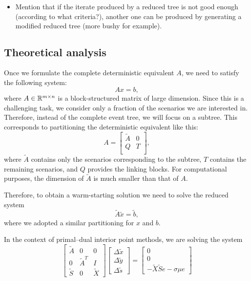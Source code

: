 {\begin{itemize}
\item Mention that if the iterate produced by a reduced tree 
is not good enough (according to what criteria?), another one 
can be produced by generating a modified reduced tree (more 
bushy for example).
\end{itemize}


\subsection{Theoretical analysis}

Once we formulate the complete deterministic equivalent $A$, we need 
to satisfy the following system:
\[
Ax=b,
\]
where $A\in \mathbb{R}^{m\times n}$ is a block-structured matrix of 
large dimension. Since this is a challenging task, we consider 
only a fraction of the scenarios we are interested in. Therefore, 
instead of the complete event tree, we will focus on a subtree. 
This corresponds to partitioning the deterministic equivalent 
like this:
\[
A = \left[ \begin{array}{cc}
    \tilde{A} & 0 \\ Q & T \\
    \end{array} \right],
\]
where $\tilde{A}$ contains only the scenarios corresponding 
to the subtree, $T$ contains the remaining scenarios, and $Q$ 
provides the linking blocks. For computational purposes, the 
dimension of $\tilde{A}$ is much smaller than that of $A$.

Therefore, to obtain a warm-starting solution we need to solve 
the reduced system
\[
\tilde{A}\tilde{x}=\tilde{b},
\]
where we adopted a similar partitioning for $x$ and $b$.

In the context of primal--dual interior point methods, we are 
solving the system
\[
\left[ \begin{array}{ccc}
    \tilde{A} & 0 & 0 \\
    0 & \tilde{A}^T & I \\
    \tilde{S} & 0 & \tilde{X}
    \end{array} \right]
\left[ \begin{array}{c}
    \Delta\tilde{x} \\ \Delta\tilde{y} \\ \Delta\tilde{s}
\end{array} \right] = 
\left[ \begin{array}{c}
      0 \\ 0 \\ -\tilde{X}\tilde{S}e - \sigma\mu e
\end{array} \right]
\]

}
